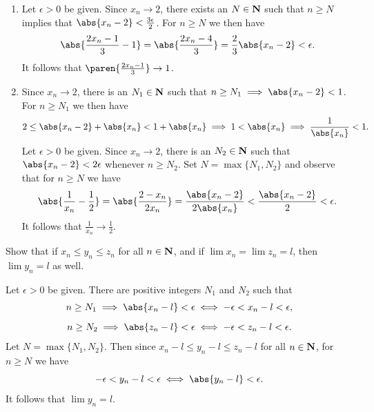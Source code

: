 \documentclass{lew98_solutions}
\begin{document}
\begin{solution}
    \begin{enumerate}
        \item Let \( \epsilon > 0 \) be given. Since \( x_n \to 2 \), there exists an \( N \in \mathbf{N} \) such that \( n \geq N \) implies that \( \abs{x_n - 2} < \tfrac{3 \epsilon}{2} \). For \( n \geq N \) we then have
        \[
            \abs{\frac{2 x_n - 1}{3} - 1} = \abs{\frac{2 x_n - 4}{3}} = \frac{2}{3} \abs{x_n - 2} < \epsilon.
        \]
        It follows that \( \paren{ \frac{2 x_n - 1}{3} } \to 1 \).

        \item Since \( x_n \to 2 \), there is an \( N_1 \in \mathbf{N} \) such that \( n \geq N_1 \implies \abs{x_n - 2} < 1 \). For \( n \geq N_1 \) we then have
        \[
            2 \leq \abs{x_n - 2} + \abs{x_n} < 1 + \abs{x_n} \implies 1 < \abs{x_n} \implies \frac{1}{\abs{x_n}} < 1.
        \]
        Let \( \epsilon > 0 \) be given. Since \( x_n \to 2 \), there is an \( N_2 \in \mathbf{N} \) such that \( \abs{x_n - 2} < 2 \epsilon \) whenever \( n \geq N_2 \). Set \( N = \max \{ N_1, N_2 \} \) and observe that for \( n \geq N \) we have
        \[
            \abs{\frac{1}{x_n} - \frac{1}{2}} = \abs{\frac{2 - x_n}{2 x_n}} = \frac{\abs{x_n - 2}}{2 \abs{x_n}} < \frac{\abs{x_n - 2}}{2} < \epsilon.
        \]
        It follows that \( \tfrac{1}{x_n} \to \tfrac{1}{2} \).
    \end{enumerate}
\end{solution}

\begin{exercise}
\label{ex:2.3.3}
    Show that if \( x_n \leq y_n \leq z_n \) for all \( n \in \mathbf{N} \), and if \( \lim x_n = \lim z_n = l \), then \( \lim y_n = l \) as well.
\end{exercise}

\begin{solution}
    Let \( \epsilon > 0 \) be given. There are positive integers \( N_1 \) and \( N_2 \) such that
    \begin{gather*}
        n \geq N_1 \implies \abs{x_n - l} < \epsilon \iff -\epsilon < x_n - l < \epsilon, \\[2mm]
        n \geq N_2 \implies \abs{z_n - l} < \epsilon \iff -\epsilon < z_n - l < \epsilon.
    \end{gather*}
    Let \( N = \max \{ N_1, N_2 \} \). Then since \( x_n - l \leq y_n - l \leq z_n - l \) for all \( n \in \mathbf{N} \), for \( n \geq N \) we have
    \[
        -\epsilon < y_n - l < \epsilon \iff \abs{y_n - l} < \epsilon.
    \]
    It follows that \( \lim y_n = l \).
\end{solution}
\end{document}
